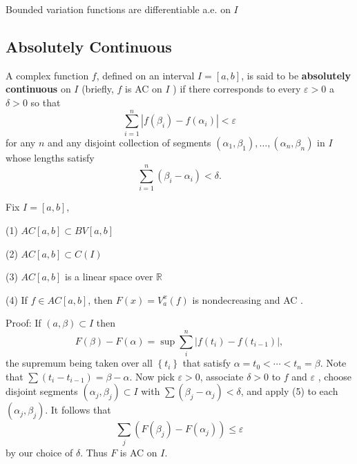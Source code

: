 \documentclass[12pt, a4paper, oneside]{book}
\begin{document}
\begin{corollary}
    Bounded variation functions are differentiable a.e. on $I$
\end{corollary}

\subsection{Absolutely Continuous }

\begin{definition}
    A complex function $f$, defined on an interval $I=[a, b]$, is said to be \textbf{absolutely continuous} on $I$ (briefly, $f$ is AC on $I$ ) if there corresponds to every $\varepsilon>0$ a $\delta>0$ so that
    \begin{equation*}
        \sum_{i=1}^n
        \left|f\left(\beta_i\right)-f\left(\alpha_i\right)\right|<\varepsilon
    \end{equation*}
    for any $n$ and any disjoint collection of segments $\left(\alpha_1, \beta_1\right), \ldots,\left(\alpha_n, \beta_n\right)$ in $I$ whose lengths satisfy
    \begin{equation*}
        \sum_{i=1}^n\left(\beta_i-\alpha_i\right)<\delta .
    \end{equation*}
\end{definition}

\begin{proposition}
    Fix $I=[a,b]$,

    (1) $AC[a,b] \subset BV[a,b]$

    (2) $AC[a,b]\subset C(I) $

    (3) $AC[a,b]$ is a linear space over $\mathbb{R}$

    (4) If $f \in AC[a,b]$, then $F(x)= V_a^x\left(f\right)$ is nondecreasing and AC .

    Proof:
    If $(a, \beta) \subset I$ then
    \begin{equation*}
        F(\beta)-F(\alpha)=\sup \sum_i^n\left|f\left(t_i\right)-f\left(t_{i-1}\right)\right|,
    \end{equation*}
    the supremum being taken over all $\left\{t_i\right\}$ that satisfy $\alpha=t_0<\cdots<t_n=\beta$.
    Note that $\sum\left(t_i-t_{i-1}\right)=\beta-\alpha$.
    Now pick $\varepsilon>0$, associate $\delta>0$ to $f$ and $\varepsilon$ , choose disjoint segments $\left(\alpha_j, \beta_j\right) \subset I$ with $\sum\left(\beta_j-\alpha_j\right)<\delta$, and apply (5) to each $\left(\alpha_j, \beta_j\right)$.
    It follows that
    \begin{equation*}
        \sum_j\left(F\left(\beta_j\right)-F\left(\alpha_j\right)\right) \leq \varepsilon
    \end{equation*}
    by our choice of $\delta$. Thus $F$ is AC on $I$.
\end{proposition}
\end{document}
